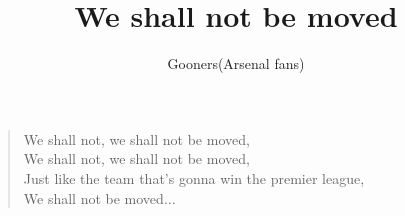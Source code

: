 \documentclass[a4paper,12pt]{article}
\title{We shall not be moved}
\author{Gooners(Arsenal fans)}
\date{}
\begin{document}
	
	\maketitle
	
	\begin{verse}
		
		We shall not, we shall not be moved, \\
		We shall not, we shall not be moved, \\
		Just like the team that's gonna win the premier league, \\
		We shall not be moved$\ldots$
		
	\end{verse}
	
\end{document}

